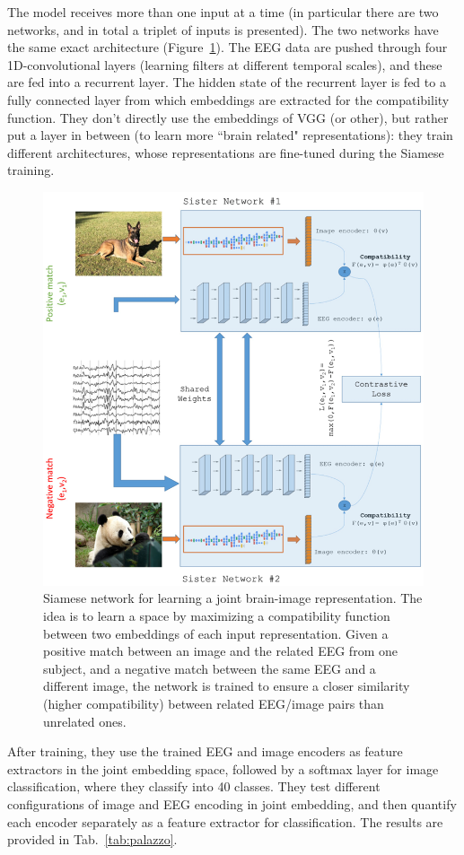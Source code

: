 The model receives more than one input at a time (in particular there are two networks, and in total a triplet of inputs is presented). The two networks have the same exact architecture (Figure~\ref{fig:palazzo}). The EEG data are pushed through four 1D-convolutional layers (learning filters at different temporal scales), and these are fed into a recurrent layer. The hidden state of the recurrent layer is fed to a fully connected layer from which embeddings are extracted for the compatibility function.
They don't directly use the embeddings of VGG (or other), but rather put a layer in between (to learn more ``brain related" representations): they train different architectures, whose representations are fine-tuned during the Siamese training.

\begin{figure}[!ht]
    \centering
    \captionsetup{width=.8\linewidth}
    \includegraphics[width=0.6\linewidth]{images/palazzo.png}
    \caption{Siamese network for learning a joint brain-image representation. The idea is to learn a space by maximizing a compatibility function between two embeddings of each input representation. Given a positive match between an image and the related EEG from one subject, and a negative match between the same EEG and a different image, the network is trained to ensure a closer similarity (higher compatibility) between related EEG/image pairs than unrelated ones.}
    \label{fig:palazzo}
\end{figure}

After training, they use the trained EEG and image encoders as feature extractors in the joint embedding space, followed by a softmax layer for image classification, where they classify into 40 classes. They test different configurations of image and EEG encoding in joint embedding, and then quantify each encoder separately as a feature extractor for classification. The results are provided in Tab.~\ref{tab:palazzo}.

